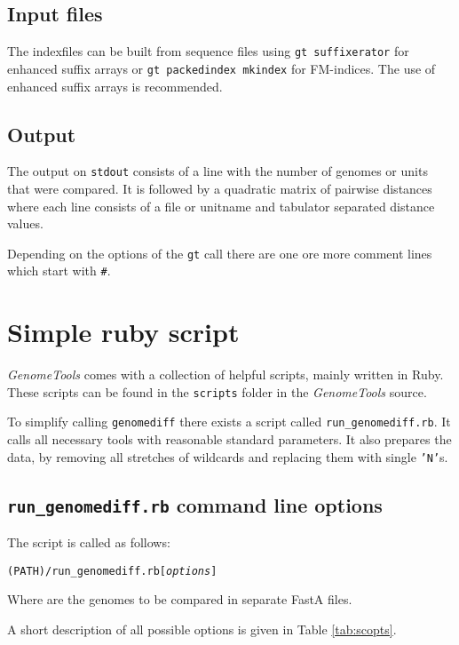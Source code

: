 \documentclass[12pt,titlepage]{article}
\newcommand{\Gdiff}{\texttt{genomediff}\xspace}
\newcommand{\RGdiff}{\texttt{run\_genomediff.rb}\xspace}
\newcommand{\GenomeTools}{\textit{GenomeTools}\xspace}
\newcommand{\Gt}{\texttt{gt}\xspace}
\newcommand{\Gtsuffixerator}{\texttt{gt suffixerator}\xspace}
\newcommand{\Gtpackedindex}{\texttt{gt packedindex mkindex}\xspace}
\newcommand{\FastA}{FastA\xspace}
\newcommand{\File}[1]{\texttt{\small #1}}
\begin{document}
\subsection{Input files}

The indexfiles can be built from sequence files using \Gtsuffixerator{} for
enhanced suffix arrays or \Gtpackedindex{} for FM-indices. The use of
enhanced suffix arrays is recommended.

\subsection{Output}

The output on \texttt{stdout} consists of a line with the number of genomes or units
that were compared. It is followed by a quadratic matrix of pairwise
distances where each line consists of a file or unitname and tabulator
separated distance values.

Depending on the options of the \Gt call there are one ore more comment lines
which start with \texttt{\#}.

\section{Simple ruby script}

\GenomeTools comes with a collection of helpful scripts, mainly written in
Ruby. These scripts can be found in the \File{scripts} folder in the
\GenomeTools source.

To simplify calling \Gdiff there exists a script called \RGdiff. It calls all
necessary tools with reasonable standard parameters. It also prepares the
data, by removing all stretches of wildcards and replacing them with single
\texttt{'N'}s.

\subsection{\RGdiff command line options}

The script is called as follows:

\texttt{(PATH)/\RGdiff [\textit{\small options}]} 

Where  are the genomes to be compared in separate
\FastA files.

A short description of all possible options is given in Table
\ref{tab:scopts}.
\end{document}

